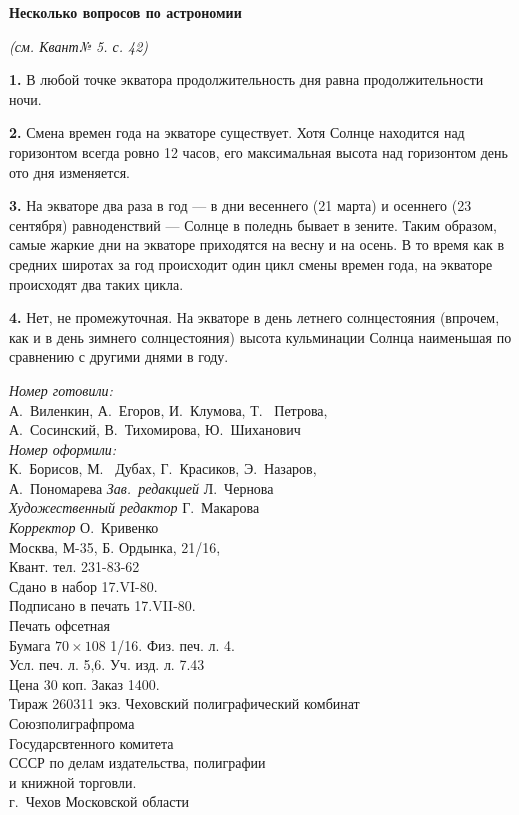 \begin{multicols}{2}
\textbf{Несколько вопросов по астрономии}

\textit{(см. \guillemotleft Квант\guillemotright № 5. с. 42)}

\textbf{1.} В любой точке экватора продолжительность дня равна продолжительности ночи.

\textbf{2.} Смена времен года на экваторе существует. Хотя Солнце находится над горизонтом всегда ровно 12 часов, его максимальная высота над горизонтом день ото дня изменяется. 

\textbf{3.} На экваторе два раза в год --- в дни весеннего (21 марта) и осеннего (23 сентября) равноденствий --- Солнце в поледнь бывает в зените. Таким образом, самые жаркие дни на экваторе приходятся на весну и на осень. В то время как в средних широтах за год происходит один цикл смены времен года, на экваторе происходят два таких цикла. 

\textbf{4.} Нет, не промежуточная. На экваторе в день летнего солнцестояния (впрочем, как и в день зимнего солнцестояния) высота кульминации Солнца наименьшая по сравнению с другими днями в году.\\
\vspace{6cm}

\hline
\textit{Номер готовили:} \\
А.~Виленкин, А.~Егоров, И.~Клумова, Т.~ Петрова, \\
А.~Сосинский, В.~Тихомирова, Ю.~Шиханович \\
\hline
\textit{Номер оформили:} \\
К.~Борисов, М.~ Дубах, Г.~Красиков, Э.~Назаров,\\
А.~Пономарева
\hline
\emph{Зав.~редакцией} Л.~Чернова \\
\hline 
\emph{Художественный редактор} Г.~Макарова \\
\hline
\emph{Корректор} О.~Кривенко \\
 Москва, М-35, Б. Ордынка, 21/16, \\
\guillemotleft Квант\guillemotright. тел. 231-83-62 \\
Сдано в набор 17.VI-80.\\
Подписано в печать 17.VII-80. \\
Печать офсетная \\
Бумага $70\times108$ 1/16. Физ. печ. л. 4. \\
Усл. печ. л. 5,6. Уч. изд. л. 7.43\\
Цена 30 коп. Заказ 1400.\\
Тираж 260311 экз.
\hline
Чеховский полиграфический комбинат \\
Союзполиграфпрома\\
Государсвтенного комитета \\
СССР по делам издательства, полиграфии \\
и книжной торговли. \\
г.~Чехов Московской области\\
\hline
\end{multicols}
